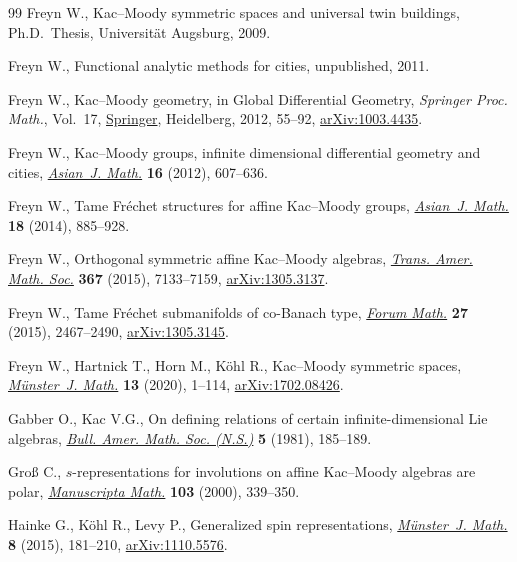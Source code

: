 \documentclass[pdftex]{sigma}
\numberwithin{equation}{section}
\begin{document}
\begin{thebibliography}{99}
Freyn W., {K}ac--{M}oody symmetric spaces and universal twin buildings, Ph.D.~Thesis, {U}niversit\"at {A}ugsburg, 2009.

Freyn W., Functional analytic methods for cities, unpublished, 2011.

Freyn W., Kac--{M}oody geometry, in Global Differential Geometry,
 \textit{Springer Proc. Math.}, Vol.~17, \href{https://doi.org/10.1007/978-3-642-22842-1_3}{Springer}, Heidelberg, 2012, 55--92,
 \href{https://arxiv.org/abs/1003.4435}{arXiv:1003.4435}.

Freyn W., Kac--{M}oody groups, infinite dimensional differential geometry and
 cities, \href{https://doi.org/10.4310/AJM.2012.v16.n4.a3}{\textit{Asian~J. Math.}} \textbf{16} (2012), 607--636.

Freyn W., Tame {F}r\'echet structures for affine {K}ac--{M}oody groups,
 \href{https://doi.org/10.4310/AJM.2014.v18.n5.a6}{\textit{Asian~J. Math.}} \textbf{18} (2014), 885--928.

Freyn W., Orthogonal symmetric affine {K}ac--{M}oody algebras, \href{https://doi.org/10.1090/tran/6257}{\textit{Trans.
 Amer. Math. Soc.}} \textbf{367} (2015), 7133--7159, \href{https://arxiv.org/abs/1305.3137}{arXiv:1305.3137}.

Freyn W., Tame {F}r\'echet submanifolds of co-{B}anach type, \href{https://doi.org/10.1515/forum-2012-0154}{\textit{Forum
 Math.}} \textbf{27} (2015), 2467--2490, \href{https://arxiv.org/abs/1305.3145}{arXiv:1305.3145}.

Freyn W., Hartnick T., Horn M., K\"ohl R., {K}ac--{M}oody symmetric spaces,
 \href{https://doi.org/10.17879/32109566476}{\textit{M\"unster~J. Math.}} \textbf{13} (2020), 1--114, \href{https://arxiv.org/abs/1702.08426}{arXiv:1702.08426}.

Gabber O., Kac V.G., On defining relations of certain infinite-dimensional
 {L}ie algebras, \href{https://doi.org/10.1090/S0273-0979-1981-14940-5}{\textit{Bull. Amer. Math. Soc. (N.S.)}} \textbf{5} (1981),
 185--189.

Gro{\ss} C., {$s$}-representations for involutions on affine {K}ac--{M}oody
 algebras are polar, \href{https://doi.org/10.1007/PL00005860}{\textit{Manuscripta Math.}} \textbf{103} (2000), 339--350.

Hainke G., K\"ohl R., Levy P., Generalized spin representations,
 \href{https://doi.org/10.17879/65219674985}{\textit{M\"unster~J. Math.}} \textbf{8} (2015), 181--210,
 \href{https://arxiv.org/abs/1110.5576}{arXiv:1110.5576}.


\end{thebibliography}
\end{document}

